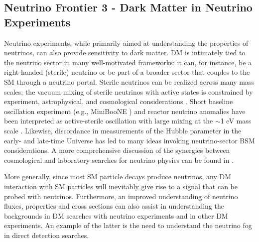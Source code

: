 \documentclass[nofootinbib]{article}
\begin{document}
\subsection{Neutrino Frontier 3 - Dark Matter in Neutrino Experiments}



Neutrino experiments, while primarily aimed at understanding the properties of neutrinos, can also provide sensitivity to dark matter. DM is intimately tied to the neutrino sector in many well-motivated frameworks: it can, for instance, be a right-handed (sterile) neutrino \cite{Drewes:2016upu,Shakya:2015xnx,Asadi:2022njl} or be part of a broader sector that couples to the SM through a neutrino portal. Sterile neutrinos can be realized across many mass scales; the vacuum mixing of sterile neutrinos with active states is constrained by experiment, astrophysical, and cosmological considerations \cite{Kusenko:2004qc}.
Short baseline oscillation experiment (e.g., MiniBooNE \cite{MiniBooNE:2018esg}) and reactor neutrino \cite{DayaBay:2017jkb,Hayes:2017res} anomalies have been interpreted as active-sterile oscillation with large mixing at the $\sim$1 eV mass scale \cite{Acero:2022wqg}.
Likewise, discordance in measurements of the Hubble parameter in the early- and late-time Universe \cite{Planck:2018vyg,Riess:2019cxk,Freedman:2019jwv,Wong:2019kwg} has led to many ideas invoking neutrino-sector BSM considerations.
A more comprehensive discussion of the synergies between cosmological and laboratory searches for neutrino physics can be found in \cite{Abazajian:2022ofy}.

More generally, since most SM particle decays produce neutrinos, any DM interaction with SM particles will inevitably give rise to a signal that can be probed with neutrinos. Furthermore, an improved understanding of neutrino fluxes, properties and cross sections can also assist in understanding the backgrounds in DM searches with neutrino experiments and in other DM experiments. An example of the latter is the need to understand the neutrino fog in direct detection searches.     
\end{document}
